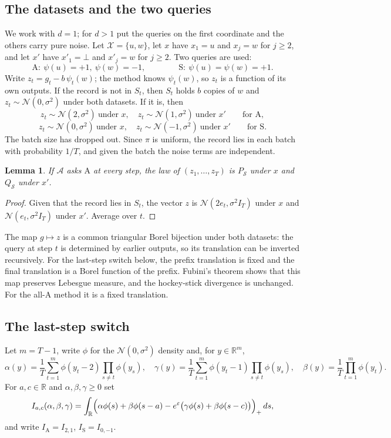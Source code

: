 \documentclass[11pt]{amsart}
\newtheorem{lemma}[theorem]{Lemma}
\theoremstyle{definition}
\theoremstyle{remark}
\newcommand{\R}{\mathbb R}
\newcommand{\N}{\mathcal N}
\newcommand{\ANTI}{\mathrm{A}}
\newcommand{\SAME}{\mathrm{S}}
\begin{document}
\subsection{The datasets and the two queries}
We work with $d=1$; for $d>1$ put the queries on the first coordinate and the others carry pure noise. Let $\mathcal X=\{u,w\}$, let $x$ have $x_1=u$ and $x_j=w$ for $j\ge2$, and let $x'$ have $x'_1=\bot$ and $x'_j=w$ for $j\ge2$. Two queries are used:
\[
\ANTI:\ \psi(u)=+1,\ \psi(w)=-1,\qquad\qquad \SAME:\ \psi(u)=\psi(w)=+1 .
\]
Write $z_t=g_t-b\,\psi_t(w)$; the method knows $\psi_t(w)$, so $z_t$ is a function of its own outputs. If the record is not in $S_t$, then $S_t$ holds $b$ copies of $w$ and $z_t\sim\N(0,\sigma^2)$ under both datasets. If it is, then
\[
z_t\sim\N(2,\sigma^2)\ \text{under }x,\quad z_t\sim\N(1,\sigma^2)\ \text{under }x'\qquad\text{for }\ANTI,
\]
\[
z_t\sim\N(0,\sigma^2)\ \text{under }x,\quad z_t\sim\N(-1,\sigma^2)\ \text{under }x'\qquad\text{for }\SAME .
\]
The batch size has dropped out. Since $\pi$ is uniform, the record lies in each batch with probability $1/T$, and given the batch the noise terms are independent.

\begin{lemma}\label{lem:pair}
If $\mathcal A$ asks $\ANTI$ at every step, the law of $(z_1,\dots,z_T)$ is $P_{\mathcal S}$ under $x$ and $Q_{\mathcal S}$ under $x'$.
\end{lemma}

\begin{proof}
Given that the record lies in $S_t$, the vector $z$ is $\N(2e_t,\sigma^2I_T)$ under $x$ and $\N(e_t,\sigma^2I_T)$ under $x'$. Average over $t$.
\end{proof}

The map $g\mapsto z$ is a common triangular Borel bijection under both datasets: the query at step $t$ is determined by earlier outputs, so its translation can be inverted recursively. For the last-step switch below, the prefix translation is fixed and the final translation is a Borel function of the prefix. Fubini's theorem shows that this map preserves Lebesgue measure, and the hockey-stick divergence is unchanged. For the all-$\ANTI$ method it is a fixed translation.

\subsection{The last-step switch}
Let $m=T-1$, write $\phi$ for the $\N(0,\sigma^2)$ density and, for $y\in\R^m$,
\begin{equation}\label{eq:weights}
\alpha(y)=\frac1T\sum_{t=1}^m\phi(y_t-2)\prod_{s\ne t}\phi(y_s),\quad
\gamma(y)=\frac1T\sum_{t=1}^m\phi(y_t-1)\prod_{s\ne t}\phi(y_s),\quad
\beta(y)=\frac1T\prod_{t=1}^m\phi(y_t).
\end{equation}
For $a,c\in\R$ and $\alpha,\beta,\gamma\ge0$ set
\[
I_{a,c}(\alpha,\beta,\gamma)=\int_\R\Bigl(\alpha\phi(s)+\beta\phi(s-a)-e^{\varepsilon}\bigl(\gamma\phi(s)+\beta\phi(s-c)\bigr)\Bigr)_+\,ds,
\]
and write $I_{\ANTI}=I_{2,1}$, $I_{\SAME}=I_{0,-1}$.
\end{document}
